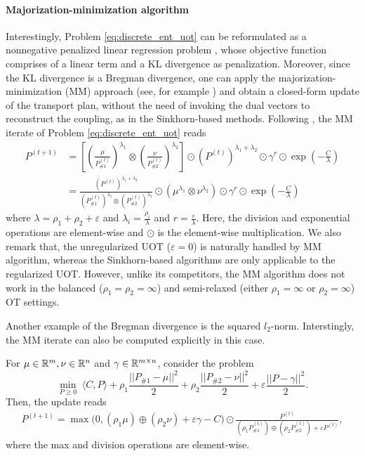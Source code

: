 \paragraph{Majorization-minimization algorithm} Interestingly, Problem \ref{eq:discrete_ent_uot}
can be reformulated as a nonnegative penalized linear regression problem \citep{Chapel21},
whose objective function comprises of a linear term and a KL divergence as penalization.
Moreover, since the KL divergence is a Bregman divergence, one can apply the
majorization-minimization (MM) approach (see, for example \citep{Hunter04,Sun17}) and obtain
a closed-form update of the transport plan, without the need of invoking the dual vectors
to reconstruct the coupling, as in the Sinkhorn-based methods. Following \citep{Chapel21},
the MM iterate of Problem \ref{eq:discrete_ent_uot} reads
\begin{align}
    P^{(t+1)} &= \left[ \left( \frac{\mu}{P^{(t)}_{\# 1}}\right)^{\lambda_1} \otimes
    \left( \frac{\nu}{P^{(t)}_{\# 2}}\right)^{\lambda_2} \right] \odot
    (P^{(t)})^{\lambda_1 + \lambda_2} \odot \gamma^r \odot \exp\left(-\frac{C}{\lambda} \right) \\
    &= \frac{(P^{(t)})^{\lambda_1 + \lambda_2}}{(P^{(t)}_{\# 1})^{\lambda_1} \otimes (P^{(t)}_{\# 2})^{\lambda_2}}
    \odot \left( \mu^{\lambda_1} \otimes \nu^{\lambda_2} \right) \odot \gamma^r
    \odot \exp\left(-\frac{C}{\lambda} \right)
\end{align}
where $\lambda = \rho_1 + \rho_2 + \varepsilon$ and
$\lambda_i = \frac{\rho_i}{\lambda}$ and $r = \frac{\varepsilon}{\lambda}$.
Here, the division and exponential operations are element-wise and
$\odot$ is the element-wise multiplication. We also remark that,
the unregularized UOT ($\varepsilon = 0$) is naturally handled by MM algorithm,
whereas the Sinkhorn-based algorithms are only applicable to the regularized UOT. However,
unlike its competitors, the MM algorithm does not work in the balanced ($\rho_1=\rho_2=\infty$)
and semi-relaxed (either $\rho_1=\infty$ or $\rho_2=\infty$) OT settings.

Another example of the Bregman divergence is the squared $l_2$-norm. Interstingly,
the MM iterate can also be computed explicitly in this case.
\begin{corollary}
  For $\mu \in \mathbb R^m, \nu \in \mathbb R^n$ and $\gamma \in \mathbb R^{m \times n}$, consider the
  problem
  \begin{equation}
  \label{uot_general}
      \min_{P \geq 0} \; \langle C, P \rangle + \rho_1 \frac{||P_{\# 1} - \mu||^2}{2}
      + \rho_2 \frac{|| P_{\# 2} - \nu ||^2}{2} + \varepsilon  \frac{||P - \gamma||^2}{2}.
  \end{equation}
  Then, the update reads
  \begin{align}
      P^{(t+1)} = \max \Big(0, (\rho_1 \mu) \oplus (\rho_2 \nu) + \varepsilon \gamma - C \Big)
      \odot \frac{P^{(t)}}{(\rho_1 P^{(t)}_{\# 1}) \oplus (\rho_2 P^{(t)}_{\# 2}) + \varepsilon P^{(t)}},
  \end{align}
  where the max and division operations are element-wise.
\end{corollary}

